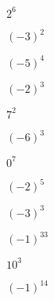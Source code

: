 \begin{BloqueEjercicios}
  \begin{ej3col}
    \item $2^6$
    \item $(-3)^2$
    \item $(-5)^4$
    \item $(-2)^3$
    \item $7^2$
    \item $(-6)^3$
    \item $0^7$
    \item $(-2)^5$
    \item $(-3)^3$
    \item $(-1)^{33}$
    \item $10^3$
    \item $(-1)^{14}$
  \end{ej3col}
\end{BloqueEjercicios}
